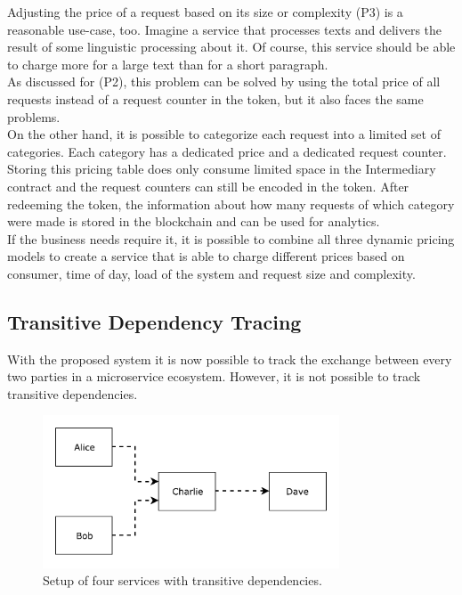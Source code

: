 \documentclass[a4paper,12pt]{scrartcl}
\begin{document}
Adjusting the price of a request based on its size or complexity (P3) is a reasonable use-case, too. Imagine a service that processes texts and delivers the result of some linguistic processing about it. Of course, this service should be able to charge more for a large text than for a short paragraph.\\
As discussed for (P2), this problem can be solved by using the total price of all requests instead of a request counter in the token, but it also faces the same problems.\\
On the other hand, it is possible to categorize each request into a limited set of categories. Each category has a dedicated price and a dedicated request counter. Storing this pricing table does only consume limited space in the Intermediary contract and the request counters can still be encoded in the token. After redeeming the token, the information about how many requests of which category were made is stored in the blockchain and can be used for analytics.\\

If the business needs require it, it is possible to combine all three dynamic pricing models to create a service that is able to charge different prices based on consumer, time of day, load of the system and request size and complexity.

\subsection{Transitive Dependency Tracing}

With the proposed system it is now possible to track the exchange between every two parties in a microservice ecosystem. However, it is not possible to track transitive dependencies.\\

\begin{figure}[H]
\centering
\includegraphics[width=250pt]{Images/TransitivityBefore.pdf}
\caption{Setup of four services with transitive dependencies.}
\label{fig:TransitivityBefore}
\end{figure}
\end{document}
